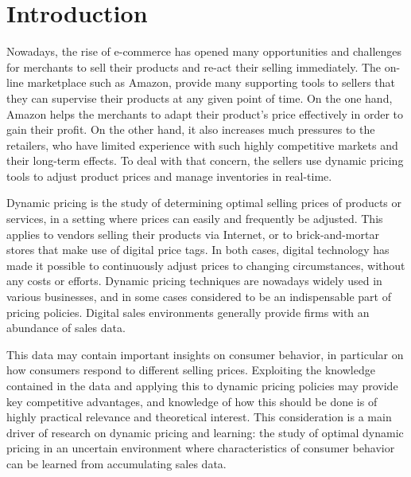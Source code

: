 \section{Introduction}
\label{sec:introduction}

Nowadays, the rise of e-commerce has opened many opportunities and challenges 
for merchants to sell their products and re-act their selling immediately. 
The on-line marketplace such as Amazon, provide many supporting tools to sellers 
that they can supervise their products at any given point of time. 
On the one hand, Amazon helps the merchants to adapt their product's 
price effectively in order to gain their profit. On the other hand, it also increases 
much pressures to the retailers, who have limited experience with such highly
competitive markets and their long-term effects. To deal with that concern, the sellers 
use dynamic pricing tools to adjust product prices and manage inventories in real-time. 

Dynamic pricing is the study of determining optimal selling prices 
of products or services, in a setting where prices can easily and 
frequently be adjusted. 
This applies to vendors selling their products via Internet, 
or to brick-and-mortar stores that make use of digital price tags. 
In both cases, digital technology has made it possible to continuously 
adjust prices to changing circumstances, without any costs or efforts. 
Dynamic pricing techniques are nowadays widely used in various businesses, 
and in some cases considered to be an indispensable part of pricing policies. 
Digital sales environments generally provide firms with an abundance of sales data.

This data may contain important insights on consumer behavior, in 
particular on how consumers respond to different selling prices. 
Exploiting the knowledge contained in the data and applying this to 
dynamic pricing policies may provide key competitive advantages, 
and knowledge of how this should be done is of highly practical relevance 
and theoretical interest. This consideration is a main driver of 
research on dynamic pricing and learning: the study of optimal 
dynamic pricing in an uncertain environment where characteristics 
of consumer behavior can be learned from accumulating sales data. 

